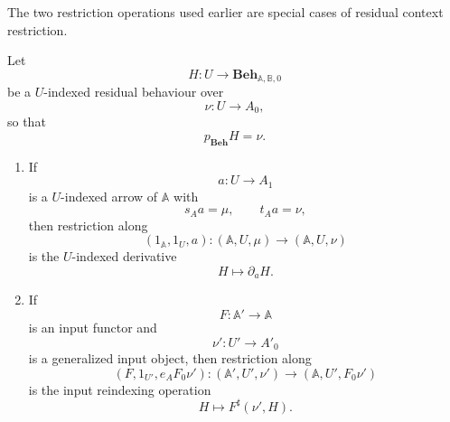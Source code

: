 The two restriction operations used earlier are special cases of residual
context restriction.

\begin{lemma}
\label{lem:derivatives-and-reindexing-as-residual-restrictions}
    Let
    \[
        H:U\to\mathbf{Beh}_{\mathbb A,\mathbb B,0}
    \]
    be a \(U\)-indexed residual behaviour over
    \[
        \nu:U\to A_0,
    \]
    so that
    \[
        p_{\mathbf{Beh}}H=\nu.
    \]

    \begin{enumerate}
        \item If
        \[
            a:U\to A_1
        \]
        is a \(U\)-indexed arrow of \(\mathbb A\) with
        \[
            s_Aa=\mu,
            \qquad
            t_Aa=\nu,
        \]
        then restriction along
        \[
            (1_{\mathbb A},1_U,a):
            (\mathbb A,U,\mu)\to(\mathbb A,U,\nu)
        \]
        is the \(U\)-indexed derivative
        \[
            H\longmapsto\partial_aH.
        \]

        \item If
        \[
            F:\mathbb A'\to\mathbb A
        \]
        is an input functor and
        \[
            \nu':U'\to A'_0
        \]
        is a generalized input object, then restriction along
        \[
            (F,1_{U'},e_AF_0\nu'):
            (\mathbb A',U',\nu')
            \to
            (\mathbb A,U',F_0\nu')
        \]
        is the input reindexing operation
        \[
            H\longmapsto F^\sharp(\nu',H).
        \]
    \end{enumerate}
\end{lemma}

